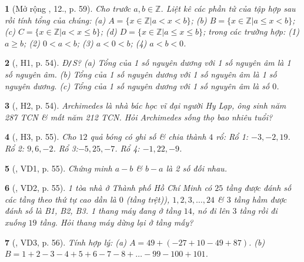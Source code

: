 \documentclass{article}
\newtheorem{baitoan}{}
\begin{document}
\begin{baitoan}[Mở rộng \cite{Trong_Toan_6_2021}, 12., p. 59]
	Cho trước $a,b\in\mathbb{Z}$. Liệt kê các phần tử của tập hợp sau rồi tính tổng của chúng: (a) $A = \{x\in\mathbb{Z}|a < x < b\}$; (b) $B = \{x\in\mathbb{Z}|a\le x < b\}$; (c) $C = \{x\in\mathbb{Z}|a < x\le b\}$; (d) $D = \{x\in\mathbb{Z}|a\le x\le b\}$; trong các trường hợp: (1) $a\ge b$; (2) $0 < a < b$; (3) $a < 0 < b$; (4) $a < b < 0$.
\end{baitoan}

\begin{baitoan}[\cite{Binh_boi_duong_Toan_6_tap_1}, H1, p. 54]
	{\rm Đ{\tt/}S?} (a) Tổng của 1 số nguyên dương với 1 số nguyên âm là 1 số nguyên âm. (b) Tổng của 1 số nguyên dương với 1 số nguyên âm là 1 số nguyên dương. (c) Tổng của 1 số nguyên dương với 1 số nguyên âm là số $0$.
\end{baitoan}

\begin{baitoan}[\cite{Binh_boi_duong_Toan_6_tap_1}, H2, p. 54]
	Archimedes là nhà bác học vĩ đại người Hy Lạp, ông sinh năm {\rm287 TCN} \& mất năm {\rm212 TCN}. Hỏi Archimedes sống thọ bao nhiêu tuổi?
\end{baitoan}

\begin{baitoan}[\cite{Binh_boi_duong_Toan_6_tap_1}, H3, p. 55]
	Cho $12$ quả bóng có ghi số \& chia thành $4$ rổ: Rổ 1: $-3,-2,19$. Rổ 2: $9,6,-2$. Rổ 3:$-5,25,-7$. Rổ 4: $-1,22,-9$.
\end{baitoan}

\begin{baitoan}[\cite{Binh_boi_duong_Toan_6_tap_1}, VD1, p. 55]
	Chứng minh $a - b$ \& $b - a$ là 2 số đối nhau.
\end{baitoan}

\begin{baitoan}[\cite{Binh_boi_duong_Toan_6_tap_1}, VD2, p. 55]
	1 tòa nhà ở Thành phố Hồ Chí Minh có $25$ tầng được đánh số các tầng theo thứ tự cao dần là $0$ (tầng trệt)), $1,2,3,\ldots,24$ \& $3$ tầng hầm được đánh số là B1, B2, B3. 1 thang máy đang ở tầng $14$, nó đi lên $3$ tầng rồi đi xuống $19$ tầng. Hỏi thang máy dừng lại ở tầng mấy?
\end{baitoan}

\begin{baitoan}[\cite{Binh_boi_duong_Toan_6_tap_1}, VD3, p. 56]
	Tính hợp lý: (a) $A = 49 + (-27 + 10 - 49 + 87)$. (b) $B = 1 + 2 - 3 - 4 + 5 + 6 - 7 - 8 + \ldots - 99 - 100 + 101$.
\end{baitoan}
\end{document}

